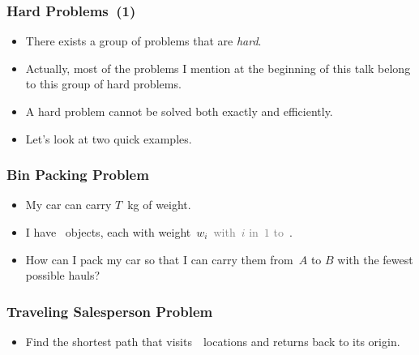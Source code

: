 %
\begin{frame}%
\frametitle{Hard Problems~(1)}%
\begin{itemize}%
\item There exists a group of problems that are \emph{hard}.%
%
\item<2-> Actually, most of the problems I mention at the beginning of this talk belong to this group of hard problems.%
%
\item<3-> A hard problem cannot be solved both exactly and efficiently.%
%
\item<4-> Let's look at two quick examples.%
\end{itemize}%
\end{frame}%
%
\begin{frame}[t]%
\frametitle{Bin Packing Problem}%
\begin{itemize}%
\item My car can carry $T$~kg of weight.%
%
\item<2-> I have \scale~objects, each with weight~$w_i$~\textcolor{gray}{with~$i$ in~$1$ to~\scale}.%
%
\item<3-> How can I pack my car so that I can carry them from~$A$ to $B$ with the fewest possible hauls?\cite{ZLWvdBTW2024RLSOT2RBPPWIR,ZWvdBTLTW2024RLSFTDBPAANRFFFA}%
\end{itemize}%
%
%
\end{frame}%
%
\begin{frame}[t]%
\frametitle{Traveling Salesperson Problem}%
\begin{itemize}%
\item Find the shortest path that visits~\scale\ locations and returns back to its origin.\cite{ABCC2006TTSPACS,LLRKS1985TTSPAGTOCO}%
\end{itemize}%
%
%
\end{frame}%
%
%
\def\makebigmarkformat{%
\def\bigmarkformat##1{%
{\alert{\textbf{\Large{##1}}}}%
}}%
\protected\gdef\bigmark#1#2{%
\def\bigmarkformat##1{##1}%
\only<#1>{\makebigmarkformat}%
\bigmarkformat{#2}%
}%
%

